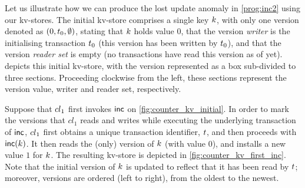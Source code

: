 
Let us illustrate how we can produce the lost update anomaly in \eqref{prog:inc2} using our kv-stores. 
The initial kv-store comprises a single key $k$, with only one 
version denoted as $(0, t_{0}, \emptyset)$, stating that $k$ holds value $0$, 
that the version \emph{writer} is the initialising transaction $t_0$ (this version has been written by $t_0$), 
and that the version \emph{reader set} is empty (no transactions have read this version as of yet). 
 depicts this initial kv-store, with the version
represented as a box sub-divided to three sections. 
Proceeding clockwise from the left, these sections represent the version value, writer and reader set, respectively.

Suppose that ${cl}_1$ first invokes $\mathsf{inc}$ on \cref{fig:counter_kv_initial}. 
In order to mark the versions that $cl_1$ reads and writes while executing the underlying transaction of $\mathsf{inc}$,  
${cl}_1$ first obtains a unique transaction identifier, $t$, 
and then proceeds with $\mathsf{inc}(k)$. 
It then reads the (only) version of $k$ (with value $0$), 
and installs a new value $1$ for $k$. 
The resulting kv-store is depicted in \cref{fig:counter_kv_first_inc}.
Note that the initial version of $k$ is updated to reflect that it has been read by $t$; 
moreover, versions are ordered (left to right), from the oldest to the newest.

